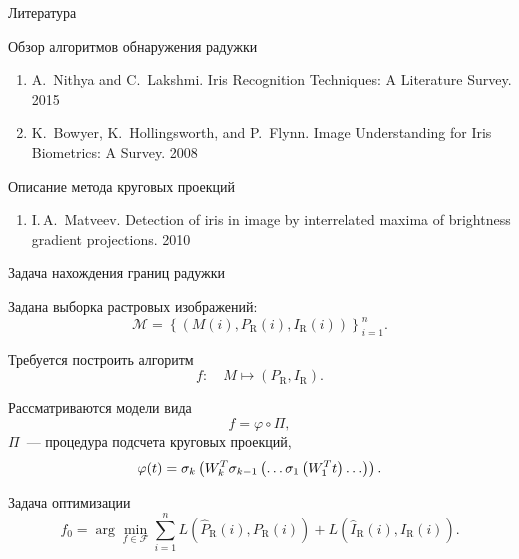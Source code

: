 \documentclass{beamer}
\begin{document}
\begin{frame}{Литература}

\begin{block}{Обзор алгоритмов обнаружения радужки}
	\begin{enumerate}
			\item A.~Nithya and C.~Lakshmi. Iris Recognition Techniques: A Literature Survey. 2015
			\item K.~Bowyer, K.~Hollingsworth, and P.~Flynn. Image Understanding for Iris Biometrics: A Survey. 2008
	\end{enumerate}
\end{block}

\begin{block}{Описание метода круговых проекций}
		\begin{enumerate}
				\item I.\,A.~Matveev. Detection of iris in image by interrelated maxima of brightness gradient projections. 2010
		\end{enumerate}
\end{block}

\end{frame}

\begin{frame}{Задача нахождения границ радужки}

Задана выборка растровых изображений:
\[\mathcal{M} = \left\{\left(M(i), P_\text{R}(i), I_\text{R}(i)\right)\right\}_{i=1}^n.\]

\begin{block}{Требуется построить алгоритм}
\vspace{-0.4cm}
\[
	f\!: \quad M \mapsto \left(P_\text{R}, I_\text{R}\right).
\]
\end{block}

\begin{block}{Рассматриваются модели вида}
\vspace{-0.4cm}
\[
f = \varphi \circ \Pi,
\]
$\Pi$~--- процедура подсчета круговых проекций,
\[
\varphi(t) = \sigma_k\large\left(W_k^T \sigma_{k-1}\large\left(\ldots \sigma_1\left(W_1^T t\right)\ldots\large\right)\large\right).
\] 

\end{block}
\vspace{-0.3cm}
\begin{block}{Задача оптимизации}
\vspace{-0.4cm}
\[
f_0 = \arg\min_{f \in \mathcal{F}} \sum_{i=1}^n L\left(\widehat{P}_\text{R}(i), P_\text{R}(i)\right) + L\left(\widehat{I}_\text{R}(i), I_\text{R}(i)\right).
\]
\end{block}
\end{frame}
\end{document}
